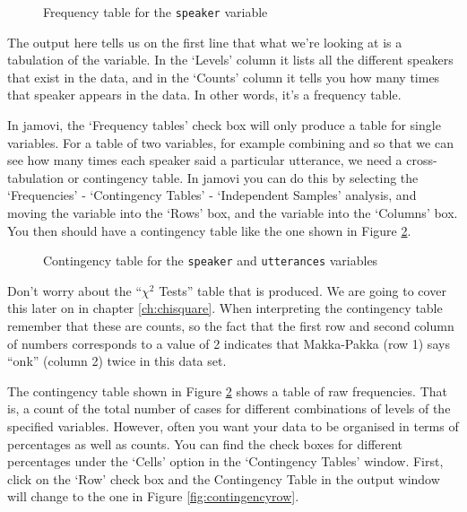 \vspace{0.5cm}
\begin{figure}[htb]
\begin{center}
\caption{Frequency table for the \texttt{speaker} variable}
\label{fig:freqtable}
\HR
\end{center}
\end{figure}

The output here tells us on the first line that what we're looking at is a tabulation of the  variable. In the `Levels' column it lists all the different speakers that exist in the data, and in the `Counts' column it tells you how many times that speaker appears in the data. In other words, it's a frequency table. 

In jamovi, the `Frequency tables' check box will only produce a table for single variables. For a table of two variables, for example combining  and  so that we can see how many times each speaker said a particular utterance, we need a cross-tabulation or contingency table. In jamovi you can do this by selecting the `Frequencies' - `Contingency Tables' - `Independent Samples' analysis, and moving the  variable into the `Rows' box, and the  variable into the `Columns' box. You then should have a contingency table like the one shown in Figure \ref{fig:contingencytable}. 

\vspace{0.5cm}
\begin{figure}[htb]
\begin{center}
\caption{Contingency table for the \texttt{speaker} and \texttt{utterances} variables}
\label{fig:contingencytable}
\HR
\end{center}
\end{figure}

Don't worry about the ``$\chi^2$ Tests'' table that is produced. We are going to cover this later on in chapter \ref{ch:chisquare}. When interpreting the contingency table remember that these are counts, so the fact that the first row and second column of numbers corresponds to a value of 2 indicates that Makka-Pakka (row 1) says ``onk'' (column 2) twice in this data set. 


The contingency table shown in Figure \ref{fig:contingencytable} shows a table of raw frequencies. That is, a count of the total number of cases for different combinations of levels of the specified variables. However, often you want your data to be organised in terms of percentages as well as counts. You can find the check boxes for different percentages under the `Cells' option in the `Contingency Tables' window. First, click on the `Row' check box and the Contingency Table in the output window will change to the one in Figure \ref{fig:contingencyrow}. 

